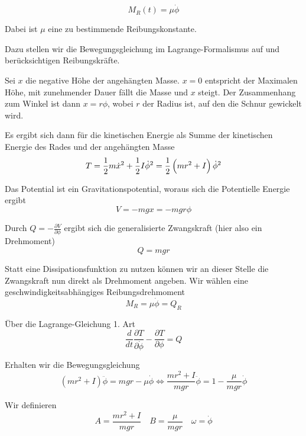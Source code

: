 \documentclass[a4paper,german,12pt,smallheadings]{scrartcl}
\begin{document}
\begin{equation}
  M_R(t) = \mu \dot{\phi}
\end{equation}

Dabei ist $\mu$ eine zu bestimmende Reibungskonstante.

Dazu stellen wir die Bewegungsgleichung im Lagrange-Formalismus auf und
berücksichtigen Reibungskräfte.

Sei $x$ die negative Höhe der angehängten Masse. $x=0$ entspricht der Maximalen
Höhe, mit zunehmender Dauer fällt die Masse und $x$ steigt. Der Zusammenhang
zum Winkel ist dann $x = r \phi$, wobei $r$ der Radius ist, auf den die Schnur
gewickelt wird.

Es ergibt sich dann für die kinetischen Energie als Summe der kinetischen
Energie des Rades und der angehängten Masse
\begin{equation}
  T = \frac{1}{2} m \dot{x}^2 + \frac{1}{2} I \dot{\phi}^2 = \frac{1}{2} \del{m r^2 + I} \dot{\phi}^2
\end{equation}

Das Potential ist ein Gravitationspotential, woraus sich die Potentielle Energie ergibt
\begin{equation}
  V = -mgx = -mgr \phi
\end{equation}

Durch $Q = -\frac{\partial V}{\partial \phi}$ ergibt sich die generalisierte
Zwangskraft (hier also ein Drehmoment)
\begin{equation}
  Q = mgr
\end{equation}

Statt eine Dissipationsfunktion zu nutzen können wir an dieser Stelle die
Zwangskraft nun direkt als Drehmoment angeben. Wir wählen eine
geschwindigkeitsabhängiges Reibungsdrehmoment
\begin{equation}
  M_R = \mu \dot{\phi} = Q_R
\end{equation}

Über die Lagrange-Gleichung 1. Art
\begin{equation}
  \frac{d}{dt} \frac{\partial T}{\partial \dot{\phi}} - \frac{\partial T}{\partial \phi} = Q
\end{equation}

Erhalten wir die Bewegungsgleichung
\begin{equation}
  (mr^2+I) \ddot{\phi} = mgr - \mu \dot{\phi} \Leftrightarrow
  \frac{mr^2+I}{mgr} \ddot{\phi} = 1 - \frac{\mu}{mgr} \dot{\phi}
\end{equation}

Wir definieren
\begin{equation*}
  A = \frac{mr^2+I}{mgr} \quad B = \frac{\mu}{mgr} \quad \omega = \dot{\phi}
\end{equation*}
\end{document}
